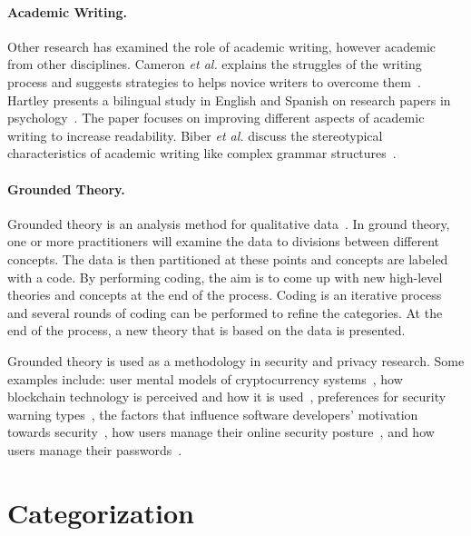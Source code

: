 \documentclass[sigconf,anonymous]{acmart}
\newcommand{\etal}{\textit{et al.}\xspace}
\begin{document}
\paragraph{Academic Writing.}  Other research has examined the role of academic writing, however academic from other disciplines. Cameron \etal explains the struggles of the writing process and suggests strategies to helps novice writers to overcome them~\cite{cameron2009demystifying}. Hartley presents a bilingual study in English and Spanish on research papers in psychology~\cite{hartley2012new}. The paper focuses on improving different aspects of academic writing to increase readability. Biber \etal discuss the stereotypical characteristics of academic writing like complex grammar structures~\cite{biber2010challenging}.   
	
	
\paragraph{Grounded Theory.}
	
Grounded theory is an analysis method for qualitative data~\cite{glaser1968discovery}. In ground theory, one or more practitioners will examine the data to divisions between different concepts. The data is then partitioned at these points and concepts are labeled with a code. By performing coding, the aim is to come up with new high-level theories and concepts at the end of the process. Coding is an iterative process and several rounds of coding can be performed to refine the categories. At the end of the process, a new theory that is based on the data is presented.

Grounded theory is used as a methodology in security and privacy research. Some examples include: user mental models of cryptocurrency systems~\cite{mai2020user}, how blockchain technology is perceived and how it is used~\cite{ruoti2019blockchain}, preferences for security warning types~\cite{danilova2020one}, the factors that influence software developers' motivation towards security~\cite{assal2018motivations},  how users manage their online security posture~\cite{ruoti2017weighing}, and how users manage their passwords~\cite{stobert2014password}.
	
\section{Categorization}
	
\end{document}
